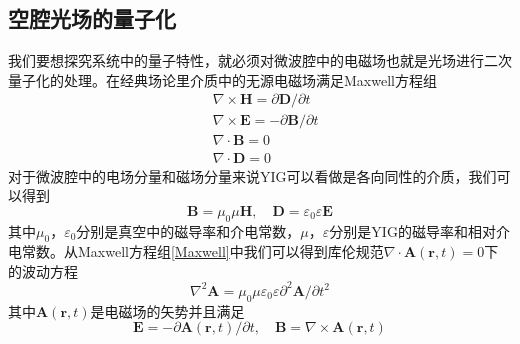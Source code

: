 \subsection{空腔光场的量子化}
我们要想探究系统中的量子特性，就必须对微波腔中的电磁场也就是光场进行二次量子化的处理。在经典场论里介质中的无源电磁场满足Maxwell方程组
\begin{equation}
\begin{aligned}
& \nabla \times \mathbf{H}=\partial \mathbf{D} / \partial t \\
& \nabla \times \mathbf{E}=-\partial \mathbf{B} / \partial t \\
& \nabla \cdot \mathbf{B}=0 \\
& \nabla \cdot \mathbf{D}=0
\end{aligned}\label{Maxwell}
\end{equation}
对于微波腔中的电场分量和磁场分量来说YIG可以看做是各向同性的介质，我们可以得到
\begin{equation}
\mathbf{B} = \mu_{0} \mu \mathbf{H}, \quad \mathbf{D} = \varepsilon_0 \varepsilon \mathbf{E}
\end{equation}
其中$\mu_{0}$，$\varepsilon_0$分别是真空中的磁导率和介电常数，$\mu$，$\varepsilon$分别是YIG的磁导率和相对介电常数。从Maxwell方程组\eqref{Maxwell}中我们可以得到库伦规范$\nabla\cdot\mathbf{A}(\mathbf{r}, t)=0$下的波动方程
\begin{equation}
\nabla^{2} \mathbf{A}=\mu_{0}\mu \varepsilon_0\varepsilon \partial^{2} \mathbf{A} / \partial t^{2} \label{WaveFunction}
\end{equation}
其中$\mathbf{A}(\mathbf{r}, t)$是电磁场的矢势并且满足
\begin{equation}
\mathbf{E}=-\partial \mathbf{A}(\mathbf{r}, t) / \partial t, \quad \mathbf{B}=\nabla \times \mathbf{A}(\mathbf{r}, t)
\label{EBARelations}
\end{equation}

